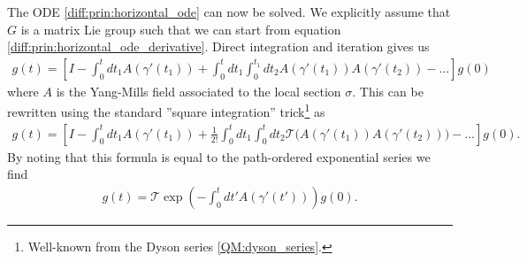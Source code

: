     \begin{method}
        The ODE \ref{diff:prin:horizontal_ode} can now be solved. We explicitly assume that $G$ is a matrix Lie group such that we can start from equation \ref{diff:prin:horizontal_ode_derivative}. Direct integration and iteration gives us
        \begin{gather}
            g(t) = \left[I - \int_0^tdt_1A(\gamma'(t_1)) + \int_0^tdt_1\int_0^{t_1}dt_2A(\gamma'(t_1))A(\gamma'(t_2))-\ldots\right]g(0)
        \end{gather}
        where $A$ is the Yang-Mills field associated to the local section $\sigma$. This can be rewritten using the standard ''square integration'' trick\footnote{Well-known from the Dyson series \ref{QM:dyson_series}.} as
        \begin{gather}
            g(t) = \left[I - \int_0^tdt_1A(\gamma'(t_1)) + \frac{1}{2!}\int_0^tdt_1\int_0^tdt_2\mathcal{T}\Big(A(\gamma'(t_1))A(\gamma'(t_2))\Big)-\ldots\right]g(0).
        \end{gather}
        By noting that this formula is equal to the path-ordered exponential series we find
        \begin{gather}
            \label{diff:g0_to_gt}
            g(t) = \mathcal{T}\exp\left(-\int_0^tdt'A(\gamma'(t'))\right)g(0).
        \end{gather}
    \end{method}


